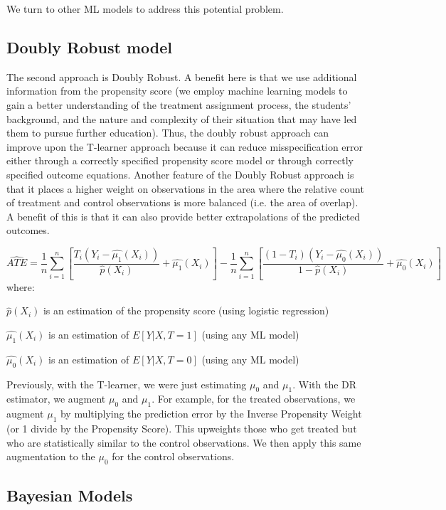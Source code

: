 \documentclass[12pt, a4paper]{article}
\begin{document}
We turn to other ML models to address this potential problem.

\subsection{Doubly Robust model}

The second approach is Doubly Robust.  A benefit here is that we use additional information from the propensity score (we employ machine learning models to gain a better understanding of the treatment assignment process, the students’ background, and the nature and complexity of their situation that may have led them to pursue further education). Thus, the doubly robust approach can improve upon the T-learner approach because it can reduce misspecification error either through a correctly specified propensity score model or through correctly specified outcome equations. Another feature of the Doubly Robust approach is that it places a higher weight on observations in the area where the relative count of treatment and control observations is more balanced (i.e. the area of overlap). A benefit of this is that it can also provide better extrapolations of the predicted outcomes.  

\begin{equation}
\hat{ATE} = \frac{1}{n} {\sum\limits_{i=1}^{n}}   [ \frac{T_i(Y_i - \hat{\mu_1}(X_i))} {\hat{p}(X_i)} + \hat{\mu_1}(X_i) ]
- \frac{1}{n} {\sum\limits_{i=1}^{n}} [ \frac{(1-T_i)(Y_i - \hat{\mu_0}(X_i))} {1-\hat{p}(X_i)} + \hat{\mu_0}(X_i) ]
\end{equation}
where:

$\hat{p}(X_i)$ is an estimation of the propensity score (using logistic regression)

$\hat{\mu_1}(X_i)$ is an estimation of $E[Y|X,T=1]$ (using any ML model)

$\hat{\mu_0}(X_i)$ is an estimation of $E[Y|X,T=0]$ (using any ML model)


Previously, with the T-learner, we were just estimating $\mu_0$ and $\mu_1$. With the DR estimator, we augment $\mu_0$ and $\mu_1$. For example, for the treated observations, we augment $\mu_1$ by multiplying the prediction error by the Inverse Propensity Weight (or 1 divide by the Propensity Score). This upweights those who get treated but who are statistically similar to the control observations. We then apply this same augmentation to the $\mu_0$ for the control observations. 


\subsection{Bayesian Models}
\end{document}
